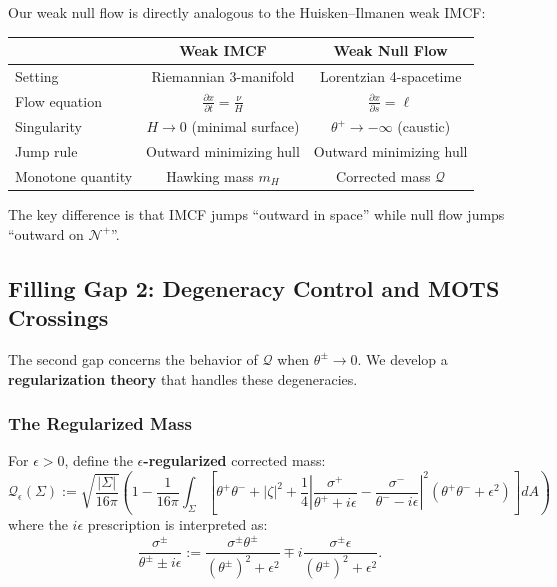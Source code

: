 \begin{remark}
Our weak null flow is directly analogous to the Huisken--Ilmanen weak IMCF:
\begin{center}
\begin{tabular}{l|c|c}
\toprule
& \textbf{Weak IMCF} & \textbf{Weak Null Flow} \\
\midrule
Setting & Riemannian 3-manifold & Lorentzian 4-spacetime \\
Flow equation & $\frac{\partial x}{\partial t} = \frac{\nu}{H}$ & $\frac{\partial x}{\partial s} = \ell$ \\
Singularity & $H \to 0$ (minimal surface) & $\theta^+ \to -\infty$ (caustic) \\
Jump rule & Outward minimizing hull & Outward minimizing hull \\
Monotone quantity & Hawking mass $m_H$ & Corrected mass $\mathcal{Q}$ \\
\bottomrule
\end{tabular}
\end{center}
The key difference is that IMCF jumps ``outward in space'' while null flow jumps ``outward on $\mathcal{N}^+$''.
\end{remark}

\subsection{Filling Gap 2: Degeneracy Control and MOTS Crossings}
\label{subsec:gap2-degeneracy}

The second gap concerns the behavior of $\mathcal{Q}$ when $\theta^\pm \to 0$. We develop a \textbf{regularization theory} that handles these degeneracies.

\subsubsection{The Regularized Mass}

\begin{definition}
\label{def:regularized-Q}
For $\epsilon > 0$, define the \textbf{$\epsilon$-regularized} corrected mass:
\begin{equation}
\mathcal{Q}_\epsilon(\Sigma) := \sqrt{\frac{|\Sigma|}{16\pi}}\left(1 - \frac{1}{16\pi}\int_\Sigma \left[\theta^+\theta^- + |\zeta|^2 + \frac{1}{4}\left|\frac{\sigma^+}{\theta^+ + i\epsilon} - \frac{\sigma^-}{\theta^- - i\epsilon}\right|^2(\theta^+\theta^- + \epsilon^2)\right] dA\right)
\end{equation}
where the $i\epsilon$ prescription is interpreted as:
\begin{equation}
\frac{\sigma^\pm}{\theta^\pm \pm i\epsilon} := \frac{\sigma^\pm \theta^\pm}{(\theta^\pm)^2 + \epsilon^2} \mp i\frac{\sigma^\pm \epsilon}{(\theta^\pm)^2 + \epsilon^2}.
\end{equation}
\end{definition}

